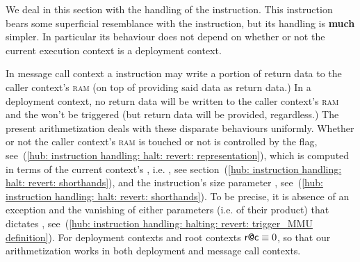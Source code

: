 We deal in this section with the handling of the  instruction.
This instruction bears some superficial resemblance with the  instruction, but its handling is \textbf{much} simpler.
In particular its behaviour does not depend on whether or not the current execution context is a deployment context. \vspace{1mm}

\saNote{} In  message call context a  instruction may write a portion of return data to the caller context's \textsc{ram} (on top of providing said data as return data.) In a deployment context, no return data will be written to the caller context's \textsc{ram} and the \mmuMod{} won't be triggered (but return data will be provided, regardless.) The present arithmetization deals with these disparate behaviours uniformly.
Whether or not the caller context's \textsc{ram} is touched or not is controlled by the 
\locTriggerMmu{} flag, see~(\ref{hub: instruction handling: halt: revert: representation}), which is computed in terms of
the current context's \RAC{}, i.e. \locRac{}, see section~(\ref{hub: instruction handling: halt: revert: shorthands}), and the instruction's size parameter \locSize{}, see~(\ref{hub: instruction handling: halt: revert: shorthands}). To be precise, it is absence of an exception and the vanishing of either parameters (i.e. of their product) that dictates \locTriggerMmu, see~(\ref{hub: instruction handling: halting: revert: trigger_MMU definition}).
For deployment contexts and root contexts $\textsf{r@c} \equiv 0$, so that our arithmetization works in both deployment and message call contexts.
